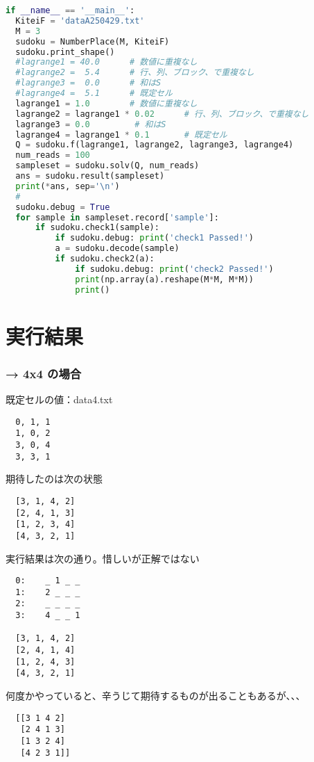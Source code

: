 \documentclass[uplatex,dvipdfmx,a4paper,11pt,oneside,openany]{jsbook}
\begin{document}
\begin{lstlisting}[language=Python]
if __name__ == '__main__':
  KiteiF = 'dataA250429.txt'
  M = 3
  sudoku = NumberPlace(M, KiteiF)
  sudoku.print_shape()
  #lagrange1 = 40.0      # 数値に重複なし
  #lagrange2 =  5.4      # 行、列、ブロック、で重複なし
  #lagrange3 =  0.0      # 和はS
  #lagrange4 =  5.1      # 既定セル
  lagrange1 = 1.0        # 数値に重複なし
  lagrange2 = lagrange1 * 0.02      # 行、列、ブロック、で重複なし
  lagrange3 = 0.0         # 和はS
  lagrange4 = lagrange1 * 0.1       # 既定セル
  Q = sudoku.f(lagrange1, lagrange2, lagrange3, lagrange4)
  num_reads = 100
  sampleset = sudoku.solv(Q, num_reads)
  ans = sudoku.result(sampleset)
  print(*ans, sep='\n')
  #
  sudoku.debug = True
  for sample in sampleset.record['sample']:
      if sudoku.check1(sample):
          if sudoku.debug: print('check1 Passed!')
          a = sudoku.decode(sample)
          if sudoku.check2(a):
              if sudoku.debug: print('check2 Passed!')
              print(np.array(a).reshape(M*M, M*M))
              print()
\end{lstlisting}


\section{実行結果}

\subsubsection{→ 4x4 の場合}

既定セルの値：data4.txt
\begin{verbatim}
  0, 1, 1
  1, 0, 2
  3, 0, 4
  3, 3, 1
\end{verbatim}

期待したのは次の状態
\begin{verbatim}
  [3, 1, 4, 2]
  [2, 4, 1, 3]
  [1, 2, 3, 4]
  [4, 3, 2, 1]
\end{verbatim}

実行結果は次の通り。惜しいが正解ではない
\begin{verbatim}
  0:	_ 1 _ _
  1:	2 _ _ _
  2:	_ _ _ _
  3:	4 _ _ 1

  [3, 1, 4, 2]
  [2, 4, 1, 4]
  [1, 2, 4, 3]
  [4, 3, 2, 1]
\end{verbatim}

何度かやっていると、辛うじて期待するものが出ることもあるが、、、
\begin{verbatim}
  [[3 1 4 2]
   [2 4 1 3]
   [1 3 2 4]
   [4 2 3 1]]
\end{verbatim}
\end{document}
